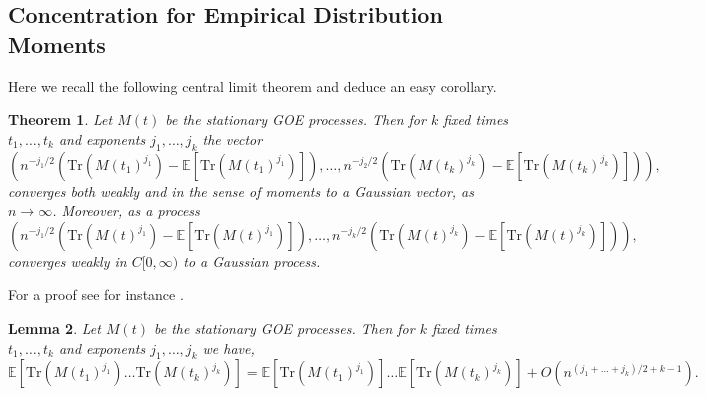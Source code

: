 \documentclass{amsart}
\newtheorem{thm}{Theorem}[section]
\newtheorem{lm}[thm]{Lemma}
\numberwithin{equation}{section}
\newcommand{\E}{\mathbb{E}}
\begin{document}
\subsection{Concentration for Empirical Distribution Moments}\label{Factorization Section}

Here we recall the following central limit theorem and deduce an easy corollary.
\begin{thm}\label{Moment Central Limit Theorem}
Let $M(t)$ be the stationary GOE processes. Then for $k$ fixed times $t_1,\dots ,t_k$ and exponents $j_1, \dots ,j_k$ the vector 
\begin{equation*}
    \left(n^{-j_1/2}\left(\mathrm{Tr}(M(t_1)^{j_1})-\E[\mathrm{Tr}(M(t_1)^{j_1})]\right),\dots,n^{-j_2/2}\left(\mathrm{Tr}(M(t_k)^{j_k})-\E[\mathrm{Tr}(M(t_k)^{j_k})]\right)\right),
\end{equation*}
converges both weakly and in the sense of moments to a Gaussian vector, as $n\to\infty$. Moreover, as a process
\begin{equation*}
    \left(n^{-j_1/2}\left(\mathrm{Tr}(M(t)^{j_1})-\E[\mathrm{Tr}(M(t)^{j_1})]\right),\dots,n^{-j_k/2}\left(\mathrm{Tr}(M(t)^{j_k})-\E[\mathrm{Tr}(M(t)^{j_k})]\right)\right),
\end{equation*}
converges weakly in $C[0,\infty)$ to a Gaussian process.
\end{thm}

For a proof see for instance \cite[Theorem 4.3.20]{Anderson_Guionnet_Zeitouni_2009}.

\begin{lm}\label{Factorization Lemma}
    Let $M(t)$ be the stationary GOE processes. Then for $k$ fixed times $t_1, \dots, t_k$ and exponents $j_1,\dots,j_k$ we have,
\begin{equation*}
    \E\left[\mathrm{Tr}(M(t_1)^{j_1})\dots\mathrm{Tr}(M(t_k)^{j_k})\right] =  \E\left[\mathrm{Tr}(M(t_1)^{j_1})\right]\dots\E\left[\mathrm{Tr}(M(t_k)^{j_k})\right]+O(n^{(j_1+\dots+j_k)/2+k-1}).
\end{equation*}
\end{lm}
\end{document}
